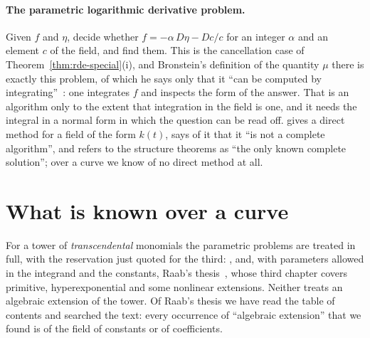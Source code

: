 \paragraph{The parametric logarithmic derivative problem.} Given $f$ and
$\eta$, decide whether $f = -\alpha\, D\eta - Dc/c$ for an integer $\alpha$
and an element $c$ of the field, and find them. This is the cancellation case
of Theorem~\ref{thm:rde-special}(i), and Bronstein's definition of the
quantity $\mu$ there is exactly this problem, of which he says only that
it ``can be computed by integrating''~\cite[Definition~3.2]{bronstein1990}:
one integrates $f$ and inspects the form of the answer. That is an
algorithm only to the extent that integration in the field is one, and it
needs the integral in a normal form in which the question can be read off.
 gives a direct method for a field of the form $k(t)$, says of
it that it ``is not a complete algorithm'', and refers to the structure
theorems as ``the only known complete solution''; over a curve we know of no
direct method at all.

\section{What is known over a curve}\label{sec:param-known}

For a tower of \emph{transcendental} monomials the parametric problems are
treated in full, with the reservation just quoted for the third:
, and, with parameters allowed in the
integrand and the constants, Raab's thesis~\cite{raab2012}, whose third
chapter covers primitive, hyperexponential and some nonlinear extensions.
Neither treats an algebraic extension of the tower. Of Raab's thesis we have
read the table of contents and searched the text: every occurrence of
``algebraic extension'' that we found is of the field of constants or of
coefficients.

